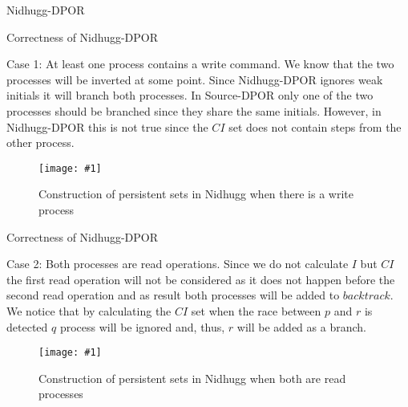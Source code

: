 \documentclass[9pt]{beamer}
\newcommand{\trace}[2]{
\begin{figure}[H]
\centering
\texttt{[image: \#1]}
\caption{#2}
\label{#2}
\end{figure}
}
\begin{document}
\begin{frame}{Nidhugg-DPOR}
    
\begin{figure}
    
\end{figure}

\end{frame}

\begin{frame}{Correctness of Nidhugg-DPOR}


Case 1: At least one process contains a write command. We know that the two processes will be inverted at some
point. Since Nidhugg-DPOR ignores weak initials it will branch both processes. 
In Source-DPOR only one of the two processes should be branched since they share the same initials. 
However, in Nidhugg-DPOR this is not true since the $CI$ set does not contain steps from the other process.

\trace{../img/nidhuggpersistent1.pdf}{Construction of persistent sets in Nidhugg when there is a write process}

\end{frame}

\begin{frame}{Correctness of Nidhugg-DPOR}
    
Case 2: Both processes are read operations. Since we do not calculate $I$ but $CI$ the first read operation will not be
considered as it does not happen before the second read operation and as result both processes will be added to
$backtrack$.  We notice that by calculating the $CI$ set when the race between $p$ and $r$ is detected $q$ process will
be ignored and, thus, $r$ will be added as a branch.

\trace{../img/nidhuggpersistent.pdf}{Construction of persistent sets in Nidhugg when both are read processes}
    
\end{frame}
\end{document}
